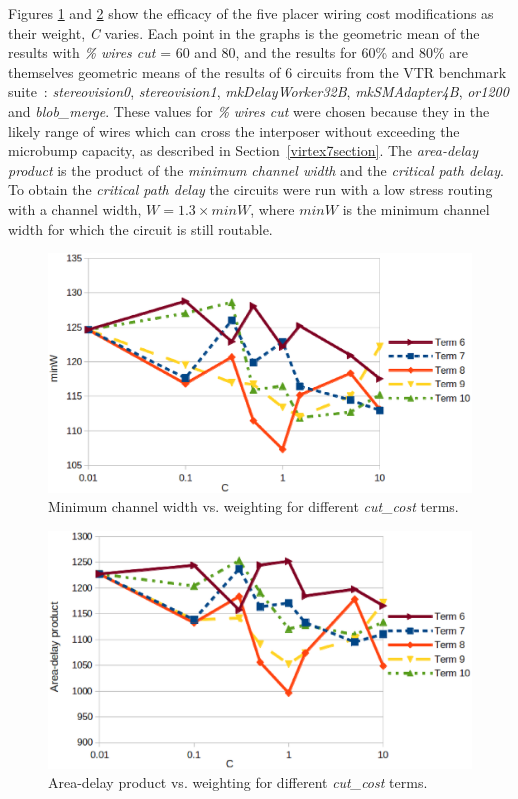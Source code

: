 \documentclass{sig-alternate-2013}
\begin{document}
Figures \ref{fig:minW_constant_sweep} and \ref{fig:areadelay_constant_sweep} show the efficacy of the five placer wiring cost modifications as their weight, \textit{C} varies. Each point in the graphs is the geometric mean of the results with \textit{\% wires cut} = 60 and 80, and the results for 60\% and 80\% are themselves geometric means of the results of 6 circuits from the VTR benchmark suite~\cite{vtr2012}:  \textit{stereovision0}, \textit{stereovision1}, \textit{mkDelayWorker32B}, \textit{mkSMAdapter4B}, \textit{or1200} and \textit{blob\_merge}. These values for \textit{\% wires cut} were chosen because they in the likely range of wires which can cross the interposer without exceeding the microbump capacity, as described in Section~\ref{virtex7section}. The \textit{area-delay product} is the product of the \textit{minimum channel width} and the \textit{critical path delay}. To obtain the \textit{critical path delay} the circuits were run with a low stress routing with a channel width, $W = 1.3 \times minW$, where $minW$ is the minimum channel width for which the circuit is still routable. 

\begin{figure}[!htbp]
\centering
\includegraphics[width=\linewidth]{minW_constant_sweep_log.eps}
\caption{Minimum channel width vs. weighting for different \textit{cut\_cost} terms.}
\label{fig:minW_constant_sweep}
\end{figure}

\begin{figure}[!htbp]
\centering
\includegraphics[width=\linewidth]{areadelay_constant_sweep_log.eps}
\caption{Area-delay product vs. weighting for different \textit{cut\_cost} terms.}
\label{fig:areadelay_constant_sweep}
\end{figure}
\end{document}
